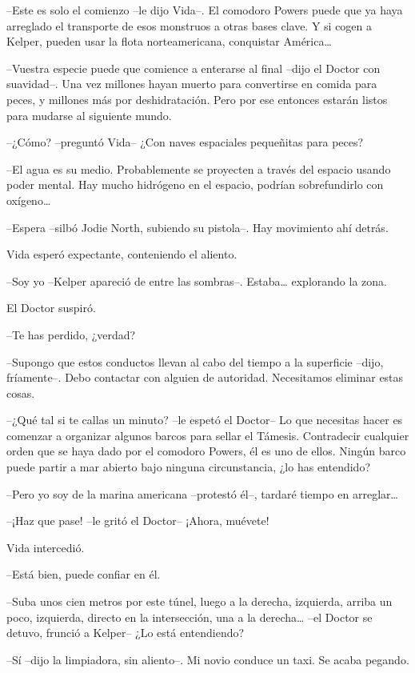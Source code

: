 {--Este es solo el comienzo --le dijo Vida--. El comodoro Powers puede
 que ya haya arreglado el transporte de esos monstruos a otras bases
 clave. Y si cogen a Kelper, pueden usar la flota norteamericana,
 conquistar América\ldots{}}

{--Vuestra especie puede que comience a enterarse al final --dijo el
 Doctor con suavidad--. Una vez millones hayan muerto para convertirse en
 comida para peces, y millones más por deshidratación. Pero por ese
entonces estarán listos para mudarse al siguiente mundo.}

{--¿Cómo? --preguntó Vida-- ¿Con naves espaciales pequeñitas para
peces?}

{--El agua es su medio. Probablemente se proyecten a través del espacio
 usando poder mental. Hay mucho hidrógeno en el espacio, podrían
 sobrefundirlo con oxígeno\ldots{}}

{--Espera --silbó Jodie North, subiendo su pistola--. Hay movimiento ahí
detrás.}

{Vida esperó expectante, conteniendo el aliento.}

{--Soy yo --Kelper apareció de entre las sombras--. Estaba\ldots{}
explorando la zona.}

{El Doctor suspiró.}

{--Te has perdido, ¿verdad?}

{--Supongo que estos conductos llevan al cabo del tiempo a la superficie
 --dijo, fríamente--. Debo contactar con alguien de autoridad.
Necesitamos eliminar estas cosas.}

{--¿Qué tal si te callas un minuto? --le espetó el Doctor-- Lo que
 necesitas hacer es comenzar a organizar algunos barcos para sellar el
 Támesis. Contradecir cualquier orden que se haya dado por el comodoro
 Powers, él es uno de ellos. Ningún barco puede partir a mar abierto bajo
ninguna circunstancia, ¿lo has entendido?}

{--Pero yo soy de la marina americana --protestó él--, tardaré tiempo en
 arreglar\ldots{}}

{--¡Haz que pase! --le gritó el Doctor-- ¡Ahora, muévete!}

{Vida intercedió.}

{--Está bien, puede confiar en él.}

{--Suba unos cien metros por este túnel, luego a la derecha, izquierda,
 arriba un poco, izquierda, directo en la intersección, una a la
 derecha\ldots{} --el Doctor se detuvo, frunció a Kelper-- ¿Lo está
entendiendo?}

{--Sí --dijo la limpiadora, sin aliento--. Mi novio conduce un taxi. Se
acaba pegando.}

